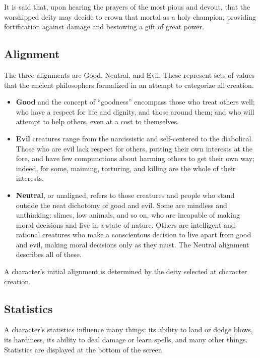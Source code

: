 It is said that, upon hearing the prayers of the most pious and devout,
that the worshipped deity may decide to crown that mortal as a holy
champion, providing fortification against damage and bestowing a gift
of great power.

\subsection{Alignment}

The three alignments are Good, Neutral, and Evil.  These represent sets
of values that the ancient philosophers formalized in an attempt to
categorize all creation.

\begin{itemize}
\item {\bf Good} and the concept of ``goodness'' encompass those who 
treat others well; who have a respect for life and dignity, and those
around them; and who will attempt to help others, even at a cost to
themselves.

\item {\bf Evil} creatures range from the narcissistic and self-centered 
to the diabolical.  Those who are evil lack respect for others, putting 
their own interests at the fore, and have few compunctions about harming 
others to get their own way; indeed, for some, maiming, torturing, and 
killing are the whole of their interests.

\item {\bf Neutral}, or unaligned, refers to those creatures and people
who stand outside the neat dichotomy of good and evil.  Some are mindless
and unthinking: slimes, low animals, and so on, who are incapable of making
moral decisions and live in a state of nature.  Others are intelligent
and rational creatures who make a conscientous decision to live apart from
good and evil, making moral decisions only as they must.  The Neutral
alignment describes all of these.

\end{itemize}

A character's initial alignment is determined by the deity selected at
character creation.

\subsection{Statistics}

A character's statistics influence many things: its ability to land or
dodge blows, its hardiness, its ability to deal damage or learn spells,
and many other things.  Statistics are displayed at the bottom of the
screen

